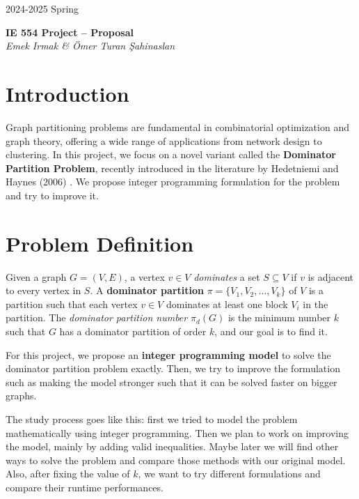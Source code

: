 \documentclass[12pt]{article}
\begin{document}
\begin{tcolorbox}[colback=white, bottomrule=1mm, sharp corners]
    2024-2025 Spring
    \begin{center}
        \Large
        \textbf{IE 554 Project -- Proposal}
        \\[4mm]
        \normalsize
        \hfill \textsl{Emek Irmak \& Ömer Turan Şahinaslan}
    \end{center}
\end{tcolorbox}

\tableofcontents
\clearpage
{}

\section{Introduction}

Graph partitioning problems are fundamental in combinatorial optimization and graph theory, offering a wide range of applications from network design to clustering. In this project, we focus on a novel variant called the \textbf{Dominator Partition Problem}, recently introduced in the literature by Hedetniemi and Haynes (2006) \cite{dominator_partitions}. We propose integer programming formulation for the problem and try to improve it. 

\section{Problem Definition}

Given a graph $G = (V, E)$, a vertex $v \in V$ \textit{dominates} a set $S \subseteq V$ if $v$ is adjacent to every vertex in $S$. A \textbf{dominator partition} $\pi = \{V_1, V_2, \dots, V_k\}$ of $V$ is a partition such that each vertex $v \in V$ dominates at least one block $V_i$ in the partition. The \textit{dominator partition number} $\pi_d(G)$ is the minimum number $k$ such that $G$ has a dominator partition of order $k$, and our goal is to find it.


For this project, we propose an \textbf{integer programming model} to solve the dominator partition problem exactly. Then, we try to improve the formulation such as making the model stronger such that it can be solved faster on bigger graphs.

The study process goes like this: first we tried to model the problem mathematically using integer programming. Then we plan to work on improving the model, mainly by adding valid inequalities. Maybe later we will find other ways to solve the problem and compare those methods with our original model. Also, after fixing the value of $k$, we want to try different formulations and compare their runtime performances.
\end{document}
